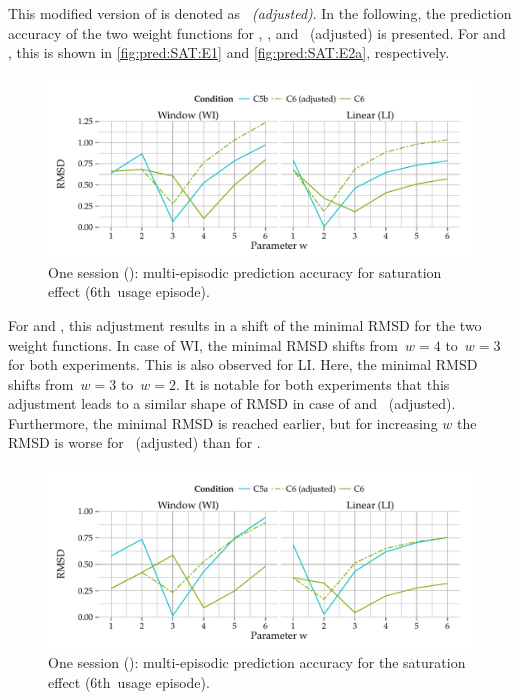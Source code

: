 This modified version of  is denoted as \emph{~(adjusted)}.
In the following, the prediction accuracy of the two weight functions for , , and ~(adjusted) is presented.
For  and \EIIa{}, this is shown in \autoref{fig:pred:SAT:E1} and \autoref{fig:pred:SAT:E2a}, respectively.

\begin{figure}
	\centering
\begin{knitrout}
\color{fgcolor}
\includegraphics[width=\maxwidth]{figure/plotE1SAT-1} 

\end{knitrout}
	\caption[One session (): multi-episodic prediction accuracy for the saturation effect]{One session ():  multi-episodic prediction accuracy for saturation effect (6th~usage episode).}
	\label{fig:pred:SAT:E1}
\end{figure}

For  and \EIIa{}, this adjustment results in a shift of the minimal \ac{RMSD} for the two weight functions.
In case of WI, the minimal \ac{RMSD} shifts from~$\mathit{w}=4$ to~$\mathit{w}=3$ for both experiments.
This is also observed for LI.
Here, the minimal \ac{RMSD} shifts from~$\mathit{w}=3$ to~$\mathit{w}=2$.
It is notable for both experiments that this adjustment leads to a similar shape of \ac{RMSD} in case of  and ~(adjusted).
Furthermore, the minimal \ac{RMSD} is reached earlier, but for increasing $\mathit{w}$ the \ac{RMSD} is worse for ~(adjusted) than for .
\begin{figure}
	\centering
\begin{knitrout}
\color{fgcolor}
\includegraphics[width=\maxwidth]{figure/plotE2SAT-1} 

\end{knitrout}
	\caption[One session (\EIIa{}):  multi-episodic prediction accuracy for the saturation effect]{One session (\EIIa{}):  multi-episodic prediction accuracy for the saturation effect (6th~usage episode).}
	\label{fig:pred:SAT:E2a}
\end{figure}


